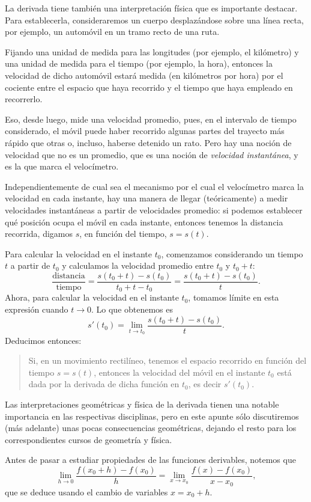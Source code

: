 La derivada tiene también una interpretación física que es importante destacar. Para establecerla, consideraremos un cuerpo desplazándose sobre una línea recta, por ejemplo, un automóvil en un tramo recto de una ruta.

Fijando una unidad de medida para las longitudes (por ejemplo, el kilómetro) y una unidad de medida para el tiempo (por ejemplo, la hora), entonces la velocidad de dicho automóvil estará medida (en kilómetros por hora) por el cociente entre el espacio que haya recorrido y el tiempo que haya empleado en recorrerlo.

Eso, desde luego, mide una velocidad promedio, pues, en el intervalo de tiempo considerado, el móvil puede haber recorrido algunas partes del trayecto más rápido que otras o, incluso, haberse detenido un rato.
Pero hay una noción de velocidad que no es un promedio, que es una noción de \emph{velocidad instantánea}, y es la que marca el velocímetro.

Independientemente de cual sea el mecanismo por el cual el velocímetro marca la velocidad en cada instante, hay una manera de llegar (teóricamente) a medir velocidades instantáneas a partir de velocidades promedio: si podemos establecer qué posición ocupa el móvil en cada instante, entonces tenemos la distancia recorrida, digamos $s$, en función del tiempo, $s=s(t)$.

Para calcular la velocidad en el instante $t_0$, comenzamos considerando un tiempo $t$ a partir de $t_0$ y calculamos la velocidad promedio entre $t_0$ y $t_0+t$:
\[
\frac{\text{distancia}}{\text{tiempo}}
=\frac{s(t_0+t)-s(t_0)}{t_0+t-t_0}
=\frac{s(t_0+t)-s(t_0)}{t}.
\]
Ahora, para calcular la velocidad en el instante $t_0$, tomamos límite en esta expresión cuando $t\to 0$. Lo que obtenemos es
\[
s'(t_0) = \lim_{t\to t_0}\frac{s(t_0+t)-s(t_0)}{t}.
\]
Deducimos entonces:
\begin{quote}
    Si, en un movimiento rectilíneo, tenemos el espacio recorrido en función del tiempo $s=s(t)$, entonces la velocidad del móvil en el instante $t_0$ está dada por la derivada de dicha función en $t_0$, es decir $s'(t_0)$.
\end{quote}

Las interpretaciones geométricas y física de la derivada tienen una notable importancia en las respectivas disciplinas, pero en este apunte sólo discutiremos (más adelante) unas pocas consecuencias geométricas, dejando el resto para los correspondientes cursos de geometría y física.

Antes de pasar a estudiar propiedades de las funciones derivables, notemos que 
\[
\lim_{h\to 0} \frac{f(x_0+h)-f(x_0)}{h}
= 
\lim_{x\to x_0} \frac{f(x)-f(x_0)}{x-x_0},
\]
que se deduce usando el cambio de variables $x=x_0+h$.

